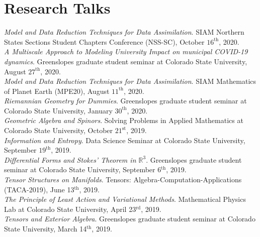\documentclass[12pt]{article} %
\begin{document}
\section{Research Talks}
\begin{flushleft}
    \emph{Model and Data Reduction Techniques for Data Assimilation}. SIAM Northern States Sections Student Chapters Conference (NSS-SC), October $16^\textrm{th}$, 2020.\\
	    \vspace*{5pt}
    \emph{A Multiscale Approach to Modeling University Impact on municipal COVID-19 dynamics}. Greenslopes graduate student seminar at Colorado State University, August $27^\textrm{th}$, 2020.\\
	    \vspace*{5pt}
    \emph{Model and Data Reduction Techniques for Data Assimilation}. SIAM Mathematics of Planet Earth (MPE20), August $11^\textrm{th}$, 2020.\\
	    \vspace*{5pt}
	\emph{Riemannian Geometry for Dummies}. Greenslopes graduate student seminar at Colorado State University, January $30^\textrm{th}$, 2020.\\
	    \vspace*{5pt}
    \emph{Geometric Algebra and Spinors}. Solving Problems in Applied Mathematics at Colorado State University, October $21^\textrm{st}$, 2019.\\
    \vspace*{5pt}
    \emph{Information and Entropy}. Data Science Seminar at Colorado State University, September $19^{\textrm{th}}$, 2019.
    \\
    \vspace*{5pt}
    \emph{Differential Forms and Stokes' Theorem in $\mathbb{R}^3$}. Greenslopes graduate student seminar at Colorado State University, September 6$^\textrm{th}$, 2019.
    \\
    \vspace*{5pt}
    \emph{Tensor Structures on Manifolds}. Tensors: Algebra-Computation-Applications (TACA-2019), June 13$^\textrm{th}$, 2019. \\
    \vspace*{5pt}
    \emph{The Principle of Least Action and Variational Methods}. Mathematical Physics Lab at Colorado State University, April 23$^\textrm{rd}$, 2019. \\
    \vspace*{5pt}
    \emph{Tensors and Exterior Algebra}. Greenslopes graduate student seminar at Colorado State University, March 14$^\textrm{th}$, 2019.\\

\end{flushleft}
\end{document}
